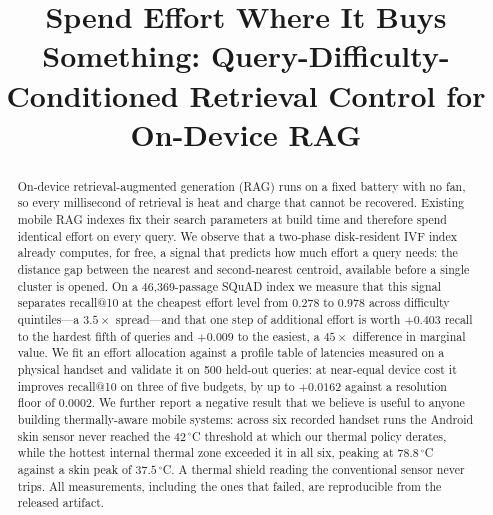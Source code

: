 \documentclass[conference]{IEEEtran}
\begin{document}
\title{Spend Effort Where It Buys Something: Query-Difficulty-Conditioned
Retrieval Control for On-Device RAG}

\author{
}

\maketitle

\begin{abstract}
On-device retrieval-augmented generation (RAG) runs on a fixed battery with no
fan, so every millisecond of retrieval is heat and charge that cannot be
recovered. Existing mobile RAG indexes fix their search parameters at build
time and therefore spend identical effort on every query. We observe that a
two-phase disk-resident IVF index already computes, for free, a signal that
predicts how much effort a query needs: the distance gap between the nearest
and second-nearest centroid, available before a single cluster is opened. On a
46{,}369-passage SQuAD index we measure that this signal separates recall@10 at
the cheapest effort level from $0.278$ to $0.978$ across difficulty
quintiles---a $3.5\times$ spread---and that one step of additional effort is
worth $+0.403$ recall to the hardest fifth of queries and $+0.009$ to the
easiest, a $45\times$ difference in marginal value. We fit an effort allocation
against a profile table of latencies measured on a physical handset and
validate it on 500 held-out queries: at near-equal device cost it improves
recall@10 on three of five budgets, by up to $+0.0162$ against a resolution
floor of $0.0002$. We further report a negative result that we believe is
useful to anyone building thermally-aware mobile systems: across six recorded
handset runs the Android skin sensor never reached the $42\,^{\circ}$C
threshold at which our thermal policy derates, while the hottest internal
thermal zone exceeded it in all six, peaking at $78.8\,^{\circ}$C against a
skin peak of $37.5\,^{\circ}$C. A thermal shield reading the conventional
sensor never trips. All measurements, including the ones that failed, are
reproducible from the released artifact.
\end{abstract}
\end{document}
